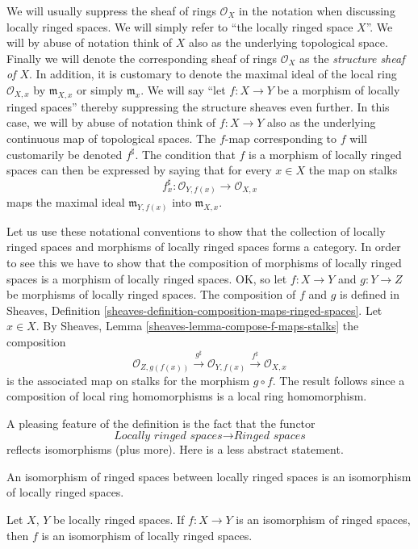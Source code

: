 \noindent
We will usually suppress the sheaf of rings $\mathcal{O}_X$
in the notation when discussing locally ringed spaces. We will
simply refer to ``the locally ringed space $X$''.
We will by abuse of notation think of $X$ also as
the underlying topological space. Finally we will denote
the corresponding sheaf of rings
$\mathcal{O}_X$ as the {\it structure sheaf of $X$}.
In addition, it is customary to denote the maximal ideal
of the local ring $\mathcal{O}_{X, x}$ by
$\mathfrak{m}_{X, x}$ or simply $\mathfrak{m}_x$.
We will say ``let $f : X \to Y$ be a morphism of locally ringed
spaces'' thereby suppressing the structure sheaves even further.
In this case, we will by abuse of notation think of $f : X\to Y$
also as the underlying continuous map of topological spaces.
The $f$-map corresponding to $f$ will customarily
be denoted $f^\sharp$. The condition that $f$ is a morphism
of locally ringed spaces can then be expressed by saying that
for every $x\in X$ the map on stalks
$$
f^\sharp_x : \mathcal{O}_{Y, f(x)} \longrightarrow \mathcal{O}_{X, x}
$$
maps the maximal ideal $\mathfrak m_{Y, f(x)}$ into
$\mathfrak m_{X, x}$.

\medskip\noindent
Let us use these notational conventions to show that the
collection of locally ringed spaces and morphisms of locally
ringed spaces forms a category. In order to see this we have
to show that the composition of morphisms of locally ringed
spaces is a morphism of locally ringed spaces. OK, so let
$f : X \to Y$ and $g : Y \to Z$ be morphisms of locally
ringed spaces. The composition of $f$ and $g$ is defined in
Sheaves, Definition \ref{sheaves-definition-composition-maps-ringed-spaces}.
Let $x \in X$. By
Sheaves, Lemma \ref{sheaves-lemma-compose-f-maps-stalks}
the composition
$$
\mathcal{O}_{Z, g(f(x))}
\xrightarrow{g^\sharp}
\mathcal{O}_{Y, f(x)}
\xrightarrow{f^\sharp}
\mathcal{O}_{X, x}
$$
is the associated map on stalks for the morphism $g \circ f$.
The result follows since a composition of local ring
homomorphisms is a local ring homomorphism.

\medskip\noindent
A pleasing feature of the definition is the fact that the functor
$$
\textit{Locally ringed spaces}
\longrightarrow
\textit{Ringed spaces}
$$
reflects isomorphisms (plus more).
Here is a less abstract statement.

\begin{lemma}
\label{lemma-isomorphism-locally-ringed}
\begin{reference}
\cite[Chapter II, \S 1, no. 32, p. 225]{FAC}
\end{reference}
\begin{slogan}
An isomorphism of ringed spaces between locally ringed spaces is an
isomorphism of locally ringed spaces.
\end{slogan}
Let $X$, $Y$ be locally ringed spaces.
If $f : X \to Y$ is an isomorphism of
ringed spaces, then $f$ is an isomorphism
of locally ringed spaces.
\end{lemma}


